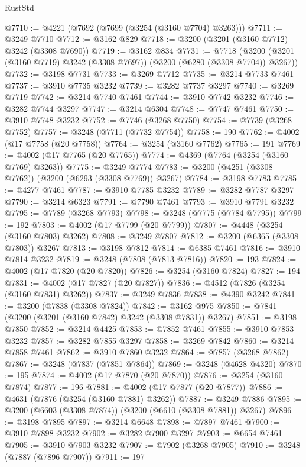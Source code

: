 \begin{lexlean}{RustStd}
\begin{coremodule}
{\begin{coremodule}
{{{{{{{{{{{{{{{{{{{{{{{{{@7710 := @4221 (@7692 (@7699 (@3254 (@3160 @7704) @3263)))
@7711 := @3249 @7710
@7712 := @3162 @829
@7718 := @3200 (@3201 (@3160 @7712) @3242 (@3308 @7690))
@7719 := @3162 @834
@7731 := @7718 (@3200 (@3201 (@3160 @7719) @3242 (@3308 @7697)) (@3200 (@6280 (@3308 @7704)) @3267))
@7732 := @3198 @7731
@7733 := @3269 @7712
@7735 := @3214 @7733 @7461
@7737 := @3910 @7735 @3232
@7739 := @3282 @7737 @3297
@7740 := @3269 @7719
@7742 := @3214 @7740 @7461
@7744 := @3910 @7742 @3232
@7746 := @3282 @7744 @3297
@7747 := @3214 @6304
@7748 := @7747 @7461
@7750 := @3910 @7748 @3232
@7752 := @7746 (@3268 @7750)
@7754 := @7739 (@3268 @7752)
@7757 := @3248 (@7711 (@7732 @7754))
@7758 := 190
@7762 := @4002 (@17 @7758 (@20 @7758))
@7764 := @3254 (@3160 @7762)
@7765 := 191
@7769 := @4002 (@17 @7765 (@20 @7765))
@7774 := @4369 (@7764 (@3254 (@3160 @7769) @3263))
@7775 := @3249 @7774
@7783 := @3200 (@4251 (@3308 @7762)) (@3200 (@6293 (@3308 @7769)) @3267)
@7784 := @3198 @7783
@7785 := @4277 @7461
@7787 := @3910 @7785 @3232
@7789 := @3282 @7787 @3297
@7790 := @3214 @6323
@7791 := @7790 @7461
@7793 := @3910 @7791 @3232
@7795 := @7789 (@3268 @7793)
@7798 := @3248 (@7775 (@7784 @7795))
@7799 := 192
@7803 := @4002 (@17 @7799 (@20 @7799))
@7807 := @4448 (@3254 (@3160 @7803) @3262)
@7808 := @3249 @7807
@7812 := @3200 (@6365 (@3308 @7803)) @3267
@7813 := @3198 @7812
@7814 := @6385 @7461
@7816 := @3910 @7814 @3232
@7819 := @3248 (@7808 (@7813 @7816))
@7820 := 193
@7824 := @4002 (@17 @7820 (@20 @7820))
@7826 := @3254 (@3160 @7824)
@7827 := 194
@7831 := @4002 (@17 @7827 (@20 @7827))
@7836 := @4512 (@7826 (@3254 (@3160 @7831) @3262))
@7837 := @3249 @7836
@7838 := @4390 @3242
@7841 := @3200 (@7838 (@3308 @7824))
@7842 := @3162 @975
@7850 := @7841 (@3200 (@3201 (@3160 @7842) @3242 (@3308 @7831)) @3267)
@7851 := @3198 @7850
@7852 := @3214 @4425
@7853 := @7852 @7461
@7855 := @3910 @7853 @3232
@7857 := @3282 @7855 @3297
@7858 := @3269 @7842
@7860 := @3214 @7858 @7461
@7862 := @3910 @7860 @3232
@7864 := @7857 (@3268 @7862)
@7867 := @3248 (@7837 (@7851 @7864))
@7869 := @3248 (@4628 @4320)
@7870 := 195
@7874 := @4002 (@17 @7870 (@20 @7870))
@7876 := @3254 (@3160 @7874)
@7877 := 196
@7881 := @4002 (@17 @7877 (@20 @7877))
@7886 := @4631 (@7876 (@3254 (@3160 @7881) @3262))
@7887 := @3249 @7886
@7895 := @3200 (@6603 (@3308 @7874)) (@3200 (@6610 (@3308 @7881)) @3267)
@7896 := @3198 @7895
@7897 := @3214 @6648
@7898 := @7897 @7461
@7900 := @3910 @7898 @3232
@7902 := @3282 @7900 @3297
@7903 := @6654 @7461
@7905 := @3910 @7903 @3232
@7907 := @7902 (@3268 @7905)
@7910 := @3248 (@7887 (@7896 @7907))
@7911 := 197
}}}}}}}}}}}}}}}}}}}}}}}}}
\end{coremodule}}
\end{coremodule}
\end{lexlean}
